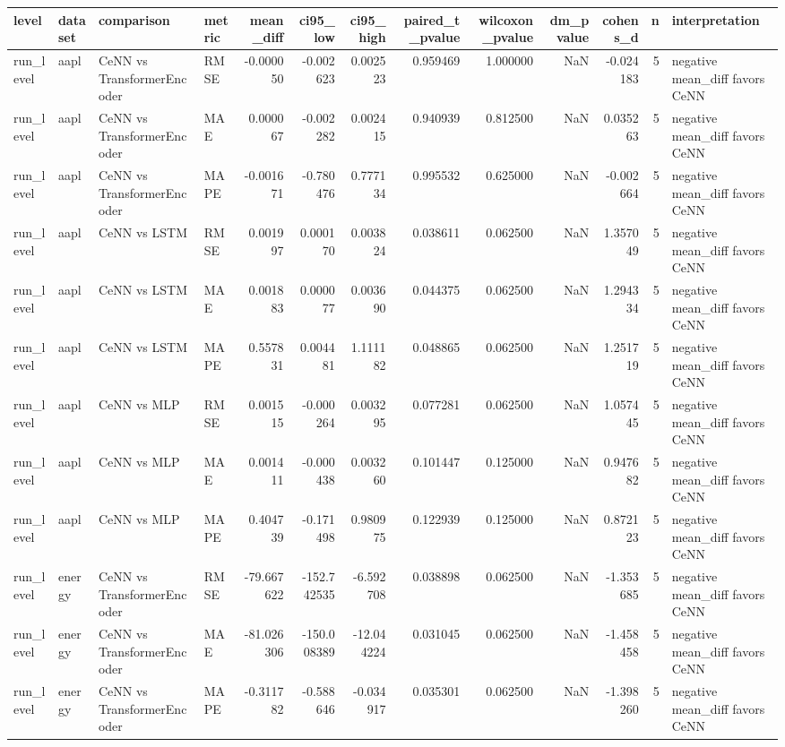 \begin{tabular}{llllrrrrrrrrl}
\toprule
level & dataset & comparison & metric & mean_diff & ci95_low & ci95_high & paired_t_pvalue & wilcoxon_pvalue & dm_pvalue & cohens_d & n & interpretation \\
\midrule
run_level & aapl & CeNN vs TransformerEncoder & RMSE & -0.000050 & -0.002623 & 0.002523 & 0.959469 & 1.000000 & NaN & -0.024183 & 5 & negative mean_diff favors CeNN \\
run_level & aapl & CeNN vs TransformerEncoder & MAE & 0.000067 & -0.002282 & 0.002415 & 0.940939 & 0.812500 & NaN & 0.035263 & 5 & negative mean_diff favors CeNN \\
run_level & aapl & CeNN vs TransformerEncoder & MAPE & -0.001671 & -0.780476 & 0.777134 & 0.995532 & 0.625000 & NaN & -0.002664 & 5 & negative mean_diff favors CeNN \\
run_level & aapl & CeNN vs LSTM & RMSE & 0.001997 & 0.000170 & 0.003824 & 0.038611 & 0.062500 & NaN & 1.357049 & 5 & negative mean_diff favors CeNN \\
run_level & aapl & CeNN vs LSTM & MAE & 0.001883 & 0.000077 & 0.003690 & 0.044375 & 0.062500 & NaN & 1.294334 & 5 & negative mean_diff favors CeNN \\
run_level & aapl & CeNN vs LSTM & MAPE & 0.557831 & 0.004481 & 1.111182 & 0.048865 & 0.062500 & NaN & 1.251719 & 5 & negative mean_diff favors CeNN \\
run_level & aapl & CeNN vs MLP & RMSE & 0.001515 & -0.000264 & 0.003295 & 0.077281 & 0.062500 & NaN & 1.057445 & 5 & negative mean_diff favors CeNN \\
run_level & aapl & CeNN vs MLP & MAE & 0.001411 & -0.000438 & 0.003260 & 0.101447 & 0.125000 & NaN & 0.947682 & 5 & negative mean_diff favors CeNN \\
run_level & aapl & CeNN vs MLP & MAPE & 0.404739 & -0.171498 & 0.980975 & 0.122939 & 0.125000 & NaN & 0.872123 & 5 & negative mean_diff favors CeNN \\
run_level & energy & CeNN vs TransformerEncoder & RMSE & -79.667622 & -152.742535 & -6.592708 & 0.038898 & 0.062500 & NaN & -1.353685 & 5 & negative mean_diff favors CeNN \\
run_level & energy & CeNN vs TransformerEncoder & MAE & -81.026306 & -150.008389 & -12.044224 & 0.031045 & 0.062500 & NaN & -1.458458 & 5 & negative mean_diff favors CeNN \\
run_level & energy & CeNN vs TransformerEncoder & MAPE & -0.311782 & -0.588646 & -0.034917 & 0.035301 & 0.062500 & NaN & -1.398260 & 5 & negative mean_diff favors CeNN \\

\end{tabular}
